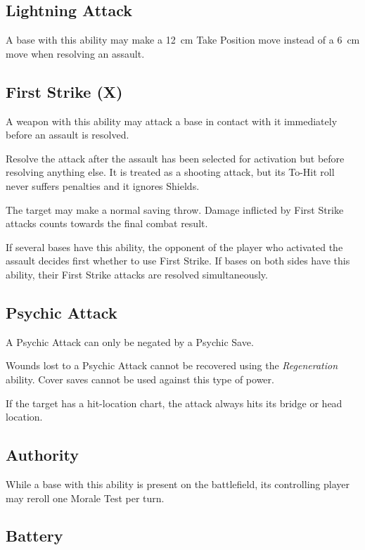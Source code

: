 \subsection{Lightning Attack}

A base with this ability may make a 12~cm Take Position move instead of a 6~cm move when resolving an assault.

\subsection{First Strike (X)}

A weapon with this ability may attack a base in contact with it immediately before an assault is resolved.

Resolve the attack after the assault has been selected for activation but before resolving anything else. It is treated as a shooting attack, but its To-Hit roll never suffers penalties and it ignores Shields.

The target may make a normal saving throw. Damage inflicted by First Strike attacks counts towards the final combat result.

If several bases have this ability, the opponent of the player who activated the assault decides first whether to use First Strike. If bases on both sides have this ability, their First Strike attacks are resolved simultaneously.

\subsection{Psychic Attack}

A Psychic Attack can only be negated by a Psychic Save.

Wounds lost to a Psychic Attack cannot be recovered using the \textit{Regeneration} ability. Cover saves cannot be used against this type of power.

If the target has a hit-location chart, the attack always hits its bridge or head location.

\subsection{Authority}

While a base with this ability is present on the battlefield, its controlling player may reroll one Morale Test per turn.

\subsection{Battery}

